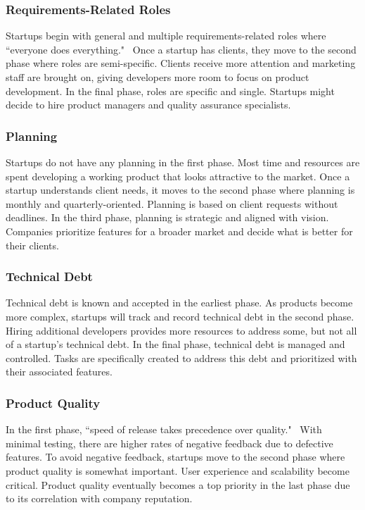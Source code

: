 \documentclass{sig-alternate}
\begin{document}
\subsubsection{Requirements-Related Roles}
Startups begin with general and multiple requirements-related roles where ``everyone does everything."~\cite{Gralha:2018} Once a startup has clients, they move to the second phase where roles are semi-specific. Clients receive more attention and marketing staff are brought on, giving developers more room to focus on product development. In the final phase, roles are specific and single. Startups might decide to hire product managers and quality assurance specialists.

\subsubsection{Planning}
Startups do not have any planning in the first phase. Most time and resources are spent developing a working product that looks attractive to the market. Once a startup understands client needs, it moves to the second phase where planning is monthly and quarterly-oriented. Planning is based on client requests without deadlines. In the third phase, planning is strategic and aligned with vision. Companies prioritize features for a broader market and decide what is better for their clients.

\subsubsection{Technical Debt}
Technical debt is known and accepted in the earliest phase. As products become more complex, startups will track and record technical debt in the second phase. Hiring additional developers provides more resources to address some, but not all of a startup's technical debt. In the final phase, technical debt is managed and controlled. Tasks are specifically created to address this debt and prioritized with their associated features.

\subsubsection{Product Quality}
In the first phase, ``speed of release takes precedence over quality."~\cite{Gralha:2018} With minimal testing, there are higher rates of negative feedback due to defective features. To avoid negative feedback, startups move to the second phase where product quality is somewhat important. User experience and scalability become critical. Product quality eventually becomes a top priority in the last phase due to its correlation with company reputation.
\end{document}
